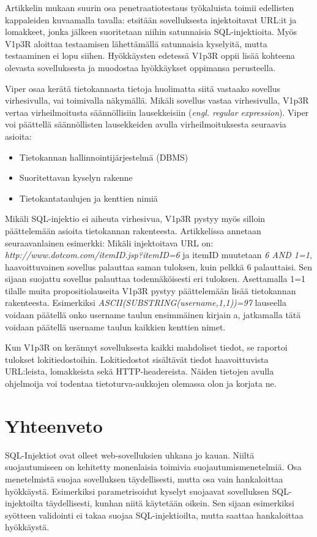 \documentclass[finnish]{tktltiki2}
\theoremstyle{definition}
\theoremstyle{remark}
\begin{document}
	Artikkelin mukaan suurin osa penetraatiotestaus työkaluista toimii edellisten kappaleiden kuvaamalla tavalla: etsitään sovelluksesta injektoitavat URL:it ja lomakkeet, jonka jälkeen suoritetaan niihin satunnaisia SQL-injektioita. Myös V1p3R aloittaa testaamisen lähettämällä satunnaisia kyselyitä, mutta testaaminen ei lopu siihen. Hyökkäysten edetessä V1p3R oppii lisää kohteena olevasta sovelluksesta ja muodostaa hyökkäykset oppimansa perusteella.
	
	 Viper osaa kerätä tietokannasta tietoja huolimatta siitä vastaako sovellus virhesivulla, vai toimivalla näkymällä. Mikäli sovellus vastaa virhesivulla, V1p3R vertaa virheilmoitusta säännöllisiin lausekkeisiin (\textit{engl. regular expression}). Viper voi päättellä säännöllisten lausekkeiden avulla virheilmoituksesta seuraavia asioita:
	 \begin{itemize}
	 	\item Tietokannan hallinnointijärjestelmä (DBMS)
	    \item Suoritettavan kyselyn rakenne
		\item Tietokantataulujen ja kenttien nimiä
	\end{itemize}
	
	Mikäli SQL-injektio ei aiheuta virhesivua, V1p3R pystyy myös silloin päättelemään asioita tietokannan rakenteesta. Artikkelissa annetaan seuraavanlainen esimerkki: Mikäli injektoitava URL on: \textit{http://www.dotcom.com/itemID.jsp?itemID=6} ja itemID muutetaan \textit{6 AND 1=1}, haavoittuvainen sovellus palauttaa saman tuloksen, kuin pelkkä 6 palauttaisi. Sen sijaan suojattu sovellus palauttaa todennäköisesti eri tuloksen. Asettamalla 1=1 tilalle muita propositiolauseita V1p3R pystyy päättelemään lisää tietokannan rakenteesta. Esimerkiksi \textit{ASCII(SUBSTRING(username,1,1))=97 } lauseella voidaan päätellä onko username taulun ensimmäinen kirjain a, jatkamalla tätä voidaan päätellä username taulun kaikkien kenttien nimet.
	
	Kun V1p3R on kerännyt sovelluksesta kaikki mahdoliset tiedot, se raportoi tulokset lokitiedostoihin. Lokitiedostot sisältävät tiedot haavoittuvista URL:leista, lomakkeista sekä HTTP-headereista. Näiden tietojen avulla ohjelmoija voi todentaa tietoturva-aukkojen olemassa olon ja korjata ne.
	
	
	\section {Yhteenveto}
	SQL-Injektiot ovat olleet web-sovelluksien uhkana jo kauan. Niiltä suojautumiseen on kehitetty monenlaisia toimivia suojautumismenetelmiä. Osa menetelmistä suojaa sovelluksen täydellisesti, mutta osa vain hankaloittaa hyökkäystä. Esimerkiksi parametrisoidut kyselyt suojaavat sovelluksen SQL-injektoilta täydellisesti, kunhan niitä käytetään oikein. Sen sijaan esimerkiksi syötteen validointi ei takaa suojaa SQL-injektioilta, mutta saattaa hankaloittaa hyökkäystä.
	
\end{document}
